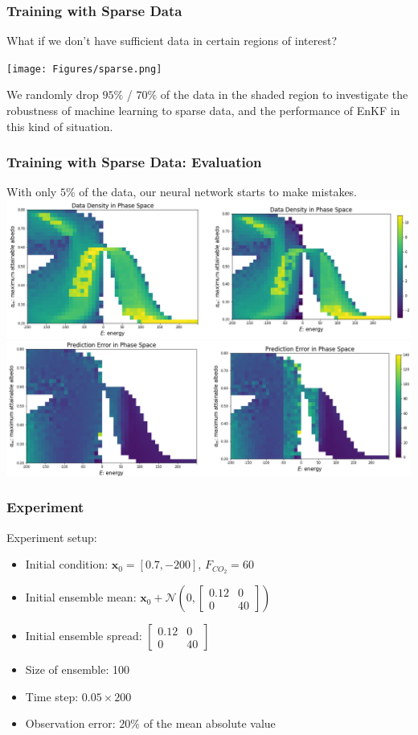 \documentclass{beamer}
\newcommand{\mx}{\textbf{x}}
\newcommand{\cN}{\mathcal{N}}
\begin{document}
\begin{frame}
\frametitle{Training with Sparse Data}
What if we don't have sufficient data in certain regions of interest?\par
\begin{center}
\texttt{[image: Figures/sparse.png]}
\end{center}
We randomly drop $95\%$ / $70\%$ of the data in the shaded region to investigate the robustness of machine learning to sparse data, and the performance of EnKF in this kind of situation.
\end{frame}

\begin{frame}
\frametitle{Training with Sparse Data: Evaluation}
With only $5\%$ of the data, our neural network starts to make mistakes.
\centering
\includegraphics[width=0.8\linewidth]{Figures/DensityMatrix_sparse_comparison.png}
\centering
\includegraphics[width=0.8\linewidth]{Figures/ErrorMatrix_sparse_comparison.png}
\end{frame}

\begin{frame}
\frametitle{Experiment}
Experiment setup:
\begin{itemize}
	\item Initial condition: $\mx_0=[0.7,-200]$, $F_{CO_2}=60$
	\item Initial ensemble mean: $\mx_0+\cN(0,\begin{bmatrix}
	0.12 & 0 \\
	0 & 40
	\end{bmatrix})$
	\item Initial ensemble spread: $\begin{bmatrix}
	0.12 & 0 \\
	0 & 40
	\end{bmatrix}$
	\item Size of ensemble: 100
	\item Time step: $0.05 \times 200$
	\item Observation error: $20\%$ of the mean absolute value
\end{itemize}
\end{frame}
\end{document}
